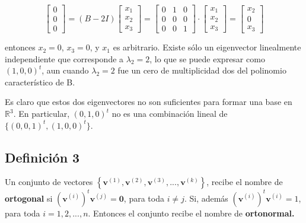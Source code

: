 \documentclass{report}
\numberwithin{subsection}{section} %
\begin{document}
    \begin{equation*}
        \begin{bmatrix}
            0 \\ 0 \\ 0
        \end{bmatrix} = (B - 2I)
        \begin{bmatrix}
            x_1 \\ x_2 \\ x_3
        \end{bmatrix} =
        \begin{bmatrix}
            0 & 1 & 0 \\
            0 & 0 & 0 \\
            0 & 0 & 1
        \end{bmatrix}  \cdot 
        \begin{bmatrix}
            x_1 \\ x_2 \\ x_3
        \end{bmatrix} =
        \begin{bmatrix}
            x_2 \\ 0 \\ x_3
        \end{bmatrix}
    \end{equation*}
    
    entonces $x_2 = 0$, $x_3 = 0$, y $x_1$ es arbitrario. Existe sólo un eigenvector linealmente independiente que corresponde a $\lambda_2 = 2$, lo que se puede expresar como $(1, 0, 0)^t$, aun cuando $\lambda_2 = 2$ fue un cero de multiplicidad dos del polinomio característico de B.

    Es claro que estos dos eigenvectores no son suficientes para formar una base en $\mathbb{R}^3$. En particular, $(0, 1, 0)^t$ no es una combinación lineal de $\{(0, 0, 1)^t, (1, 0, 0)^t\}$.

\subsection{\textnormal{Definición 3}}

Un conjunto de vectores $\left\{ \textbf{v}^{\left( 1 \right)}, \textbf{v}^{\left( 2 \right)}, \textbf{v}^{\left( 3 \right)}, ..., \textbf{v}^{\left( k \right)} \right\}$, recibe el nombre de \textbf{ortogonal} si $\left( \textbf{v}^{\left( i \right)} \right)^{t}\textbf{v}^{\left( j \right)} = \textbf{0}$, para toda $i\neq j$. Si, además $\left( \textbf{v}^{\left( i \right)} \right)^{t}\textbf{v}^{\left( i \right)} = 1$, para toda $i = 1, 2, ..., n$. Entonces el conjunto recibe el nombre de \textbf{ortonormal.}
\end{document}
